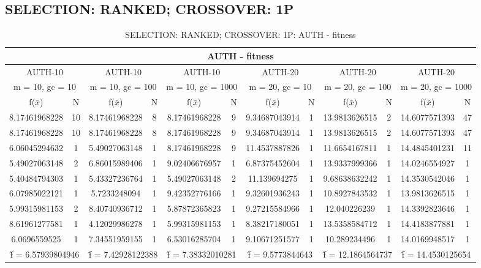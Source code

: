 \subsection{SELECTION: RANKED; CROSSOVER: 1P}
\begin{table}[H]
	\centering
	\caption{SELECTION: RANKED; CROSSOVER: 1P: AUTH - fitness}
	\begin{adjustbox}{width=1\textwidth}
		\begin{tabular}{ |c|c||c|c||c|c||c|c||c|c||c|c| }
			\hline
			\multicolumn{12}{|c|}{AUTH - fitness} \\
			\hline
			\multicolumn{2}{|c||}{AUTH-10} & \multicolumn{2}{c||}{AUTH-10} & \multicolumn{2}{c||}{AUTH-10} & \multicolumn{2}{c||}{AUTH-20} & \multicolumn{2}{c||}{AUTH-20} & \multicolumn{2}{c|}{AUTH-20}\\
			\hline
			\multicolumn{2}{|c||}{m = 10, gc = 10} & \multicolumn{2}{c||}{m = 10, gc = 100} & \multicolumn{2}{c||}{m = 10, gc = 1000} & \multicolumn{2}{c||}{m = 20, gc = 10} & \multicolumn{2}{c||}{m = 20, gc = 100} & \multicolumn{2}{c|}{m = 20, gc = 1000}\\
			\hline
			f($\bar{x}$) & N & f($\bar{x}$) & N & f($\bar{x}$) & N & f($\bar{x}$) & N & f($\bar{x}$) & N & f($\bar{x}$) & N\\
			\hline
			\hline
			8.17461968228 & 10 & 8.17461968228 & 8 & 8.17461968228 & 9 & 9.34687043914 & 1 & 13.9813626515 & 2 & 14.6077571393 & 47\\
			\hline
			8.17461968228 & 10 & 8.17461968228 & 8 & 8.17461968228 & 9 & 9.34687043914 & 1 & 13.9813626515 & 2 & 14.6077571393 & 47\\
			6.06045294632 & 1 & 5.49027063148 & 1 & 8.17461968228 & 9 & 11.4537887826 & 1 & 11.6654167811 & 1 & 14.4845401231 & 11\\
			5.49027063148 & 2 & 6.86015989406 & 1 & 9.02406676957 & 1 & 6.87375452604 & 1 & 13.9337999366 & 1 & 14.0246554927 & 1\\
			5.40484794303 & 1 & 5.43327236764 & 1 & 5.49027063148 & 2 & 11.139694275 & 1 & 9.68638632242 & 1 & 14.3530542046 & 1\\
			6.07985022121 & 1 & 5.7233248094 & 1 & 9.42352776166 & 1 & 9.32601936243 & 1 & 10.8927843532 & 1 & 13.9813626515 & 1\\
			5.99315981153 & 2 & 8.40740936712 & 1 & 5.87872365823 & 1 & 9.27215584966 & 1 & 12.040226239 & 1 & 14.3392823646 & 1\\
			8.61961277581 & 1 & 4.12029986278 & 1 & 5.99315981153 & 1 & 8.38217180051 & 1 & 13.5358584712 & 1 & 14.4183877881 & 1\\
			6.0696559525 & 1 & 7.34551959155 & 1 & 6.53016285704 & 1 & 9.10671251577 & 1 & 10.289234496 & 1 & 14.0169948517 & 1\\
			\hline
			\multicolumn{2}{|c||}{\^{f} = 6.57939804946} & \multicolumn{2}{c||}{\^{f} = 7.42928122388} & \multicolumn{2}{c||}{\^{f} = 7.38332010281} & \multicolumn{2}{c||}{\^{f} = 9.5773844643} & \multicolumn{2}{c||}{\^{f} = 12.1864564737} & \multicolumn{2}{c|}{\^{f} = 14.4530125654}\\
			\hline
		\end{tabular}
	\end{adjustbox}
\end{table}
